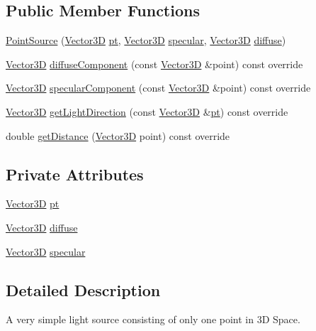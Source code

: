 \subsection*{Public Member Functions}
\begin{DoxyCompactItemize}
\item 
\hyperlink{classPointSource_a45ecabcd8c8aab5cc5bcaa88a0357d58}{Point\+Source} (\hyperlink{classVector3D}{Vector3D} \hyperlink{classPointSource_a42114a0433eca4114a77a3f8cb9e41e1}{pt}, \hyperlink{classVector3D}{Vector3D} \hyperlink{classPointSource_ae02434997baef2749ca6eaa61e98e496}{specular}, \hyperlink{classVector3D}{Vector3D} \hyperlink{classPointSource_af56ac7fa441b50c514037dd624d7c184}{diffuse})
\item 
\hyperlink{classVector3D}{Vector3D} \hyperlink{classPointSource_a445e9566d2226d1b8afd76274fb006fb}{diffuse\+Component} (const \hyperlink{classVector3D}{Vector3D} \&point) const override
\item 
\hyperlink{classVector3D}{Vector3D} \hyperlink{classPointSource_a421e0e8d3d1f69aeb095f1f9c39de7e0}{specular\+Component} (const \hyperlink{classVector3D}{Vector3D} \&point) const override
\item 
\hyperlink{classVector3D}{Vector3D} \hyperlink{classPointSource_a02a13a7b955088e32324bfb3d49b1ace}{get\+Light\+Direction} (const \hyperlink{classVector3D}{Vector3D} \&\hyperlink{classPointSource_a42114a0433eca4114a77a3f8cb9e41e1}{pt}) const override
\item 
double \hyperlink{classPointSource_a5f1af9abccf0657b9398555c935bb8bc}{get\+Distance} (\hyperlink{classVector3D}{Vector3D} point) const override
\end{DoxyCompactItemize}
\subsection*{Private Attributes}
\begin{DoxyCompactItemize}
\item 
\hyperlink{classVector3D}{Vector3D} \hyperlink{classPointSource_a42114a0433eca4114a77a3f8cb9e41e1}{pt}
\item 
\hyperlink{classVector3D}{Vector3D} \hyperlink{classPointSource_af56ac7fa441b50c514037dd624d7c184}{diffuse}
\item 
\hyperlink{classVector3D}{Vector3D} \hyperlink{classPointSource_ae02434997baef2749ca6eaa61e98e496}{specular}
\end{DoxyCompactItemize}


\subsection{Detailed Description}
A very simple light source consisting of only one point in 3D Space. 

